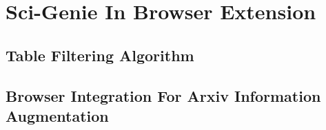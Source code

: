 \chapter{Sci-Genie In Browser Extension}
\label{sci-genie-extension}

\section{Table Filtering Algorithm}

\section{Browser Integration For Arxiv Information Augmentation}